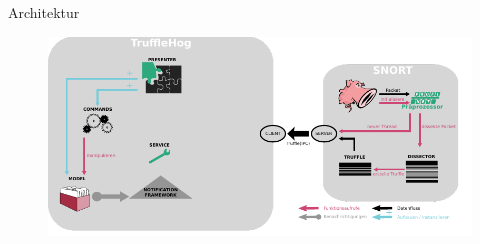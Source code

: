 \begin{frame}{Architektur}
    \begin{figure}
    	\centering
    	\includegraphics[width=\textwidth]{./images/arch/13.pdf}
    \end{figure}
\end{frame}
